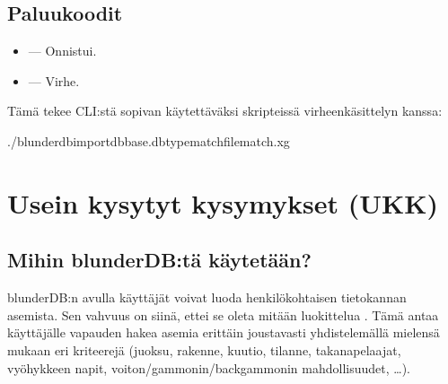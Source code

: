 \documentclass[letterpaper,10pt,finnish]{sphinxmanual}
\begin{document}
\subsection{Paluukoodit}
\label{\detokenize{cli:codes-de-retour}}\begin{itemize}
\item {} 
\sphinxAtStartPar
{} — Onnistui.

\item {} 
\sphinxAtStartPar
{} — Virhe.

\end{itemize}

\sphinxAtStartPar
Tämä tekee CLI:stä sopivan käytettäväksi skripteissä virheenkäsittelyn kanssa:

\begin{sphinxVerbatim}[commandchars=\\\{\}]
./blunderdbimport\PYGZhy{}\PYGZhy{}dbbase.db\PYGZhy{}\PYGZhy{}typematch\PYGZhy{}\PYGZhy{}filematch.xg
\end{sphinxVerbatim}

\sphinxstepscope


\section{Usein kysytyt kysymykset (UKK)}
\label{\detokenize{faq:foire-aux-questions}}\label{\detokenize{faq:faq}}\label{\detokenize{faq::doc}}

\subsection{Mihin blunderDB:tä käytetään?}
\label{\detokenize{faq:quel-est-l-utilite-de-blunderdb}}
\sphinxAtStartPar
blunderDB:n avulla käyttäjät voivat luoda henkilökohtaisen tietokannan asemista. Sen vahvuus on siinä, ettei se oleta mitään luokittelua . Tämä antaa käyttäjälle vapauden hakea asemia erittäin joustavasti yhdistelemällä mielensä mukaan eri kriteerejä (juoksu, rakenne, kuutio, tilanne, takanapelaajat, vyöhykkeen napit, voiton/gammonin/backgammonin mahdollisuudet, …).
\end{document}
